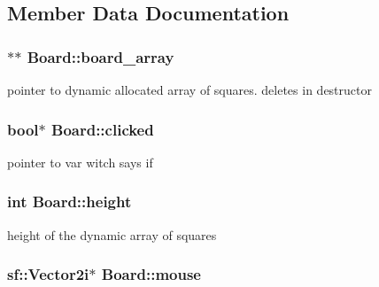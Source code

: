 \subsection{Member Data Documentation}
\hypertarget{class_board_aae4209ee856592868709d92081368777}{}
\subsubsection[{board\+\_\+array}]{$\ast$$\ast$ Board\+::board\+\_\+array\hspace{0.3cm}{\ttfamily [private]}}\label{class_board_aae4209ee856592868709d92081368777}


pointer to dynamic allocated array of squares. deletes in destructor 

\hypertarget{class_board_adbf08097362eabd4621b777261c2e4d7}{}
\subsubsection[{clicked}]{\setlength{\rightskip}{0pt plus 5cm}bool$\ast$ Board\+::clicked\hspace{0.3cm}{\ttfamily [private]}}\label{class_board_adbf08097362eabd4621b777261c2e4d7}


pointer to var witch says if 

\hypertarget{class_board_aa0cb8de0254520dc08dab5796643c8e5}{}
\subsubsection[{height}]{\setlength{\rightskip}{0pt plus 5cm}int Board\+::height\hspace{0.3cm}{\ttfamily [private]}}\label{class_board_aa0cb8de0254520dc08dab5796643c8e5}


height of the dynamic array of squares 

\hypertarget{class_board_a70eb26b4e2928c9eb58f9072380ced54}{}
\subsubsection[{mouse}]{\setlength{\rightskip}{0pt plus 5cm}sf\+::\+Vector2i$\ast$ Board\+::mouse\hspace{0.3cm}{\ttfamily [private]}}\label{class_board_a70eb26b4e2928c9eb58f9072380ced54}


